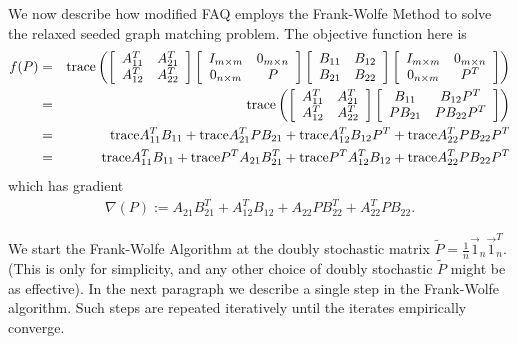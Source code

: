 \documentclass[12pt]{article}
\newcommand{\tr}{\textup{trace}}
\begin{document}
We now describe how modified FAQ employs the Frank-Wolfe Method to
solve the relaxed  seeded graph matching problem.
The objective function here is
\begin{eqnarray*}  f(P)  & =  &   \tr \left (
\left [  \begin{array}{cc}  A^T_{11} & A^T_{21} \\ A^T_{12} & A^T_{22}  \end{array} \right ]
\left [  \begin{array}{cc}  I_{m \times m} & 0_{m \times n}
\\ 0_{n \times m} & P  \end{array} \right ]
\left [  \begin{array}{cc}  B_{11} & B_{12} \\ B_{21} & B_{22}  \end{array} \right ]
\left [  \begin{array}{cc}  I_{m \times m} & 0_{m \times n}
\\ 0_{n \times m} & P^T  \end{array} \right ]
\right ) \\
& = & \tr \left (
\left [  \begin{array}{cc}  A^T_{11} & A^T_{21} \\ A^T_{12} & A^T_{22}  \end{array} \right ]
\left [  \begin{array}{cc}  B_{11} & B_{12}P^T \\ PB_{21} & PB_{22}P^T  \end{array} \right ]
\right )\\
& = & \tr A_{11}^TB_{11}+ \tr A_{21}^TPB_{21}+\tr A_{12}^TB_{12}P^T
+ \tr A_{22}^TPB_{22}P^T \\
& = &  \tr A_{11}^TB_{11}+ \tr P^T A_{21}B_{21}^T+\tr P^TA_{12}^TB_{12}
+ \tr A_{22}^TPB_{22}P^T
\end{eqnarray*}
which has gradient
\begin{eqnarray*}
\nabla (P):=A_{21}B_{21}^T+A_{12}^TB_{12}+A_{22}PB_{22}^T+A_{22}^TPB_{22} .
\end{eqnarray*}

We start the Frank-Wolfe Algorithm at the doubly stochastic matrix
$\tilde{P}=\frac{1}{n}\vec{1}_n \vec{1}_n^T$. (This is only for
simplicity, and any other choice of doubly stochastic $\tilde{P}$ might
be as effective). In the next paragraph we describe a single step in the
Frank-Wolfe algorithm. Such steps are repeated iteratively until
the iterates empirically converge.
\end{document}
